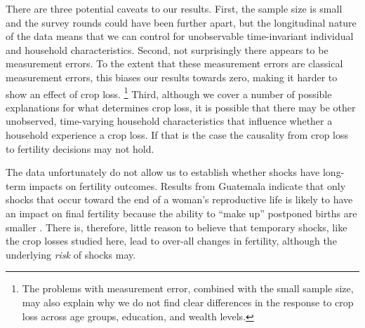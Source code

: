 \documentclass[letterpaper,12pt]{article}
\begin{document}
There are three potential caveats to our results.
First, the sample size is small and the survey rounds
could have been further apart, but the longitudinal nature
of the data means that we can control for unobservable 
time-invariant individual and household characteristics.
Second, not surprisingly there appears to be measurement 
errors.
To the extent that these measurement errors are classical 
measurement errors, this biases our results towards zero,
making it harder to show an effect of crop loss.%
\footnote{
The problems with measurement error, combined with the small
sample size, may also explain why we do not find clear
differences in the response to crop loss across age groups,
education, and wealth levels.
}
Third, although we cover a number of possible explanations
for what determines crop loss, it is possible that there may 
be other unobserved, time-varying household characteristics 
that influence whether a household experience a crop loss.
If that is the case the causality from crop loss to fertility 
decisions may not hold.


The data unfortunately do not allow us to establish whether shocks
have long-term impacts on fertility outcomes.
Results from Guatemala indicate that only shocks that occur 
toward the end of a woman's reproductive life is likely to have an 
impact on final fertility because the ability to ``make up'' 
postponed births are smaller \citep{Portner2014}.
There is, therefore, little reason to believe that temporary shocks,
like the crop losses studied here, lead to over-all changes in fertility,
although the underlying \emph{risk} of shocks may. 
\end{document}
